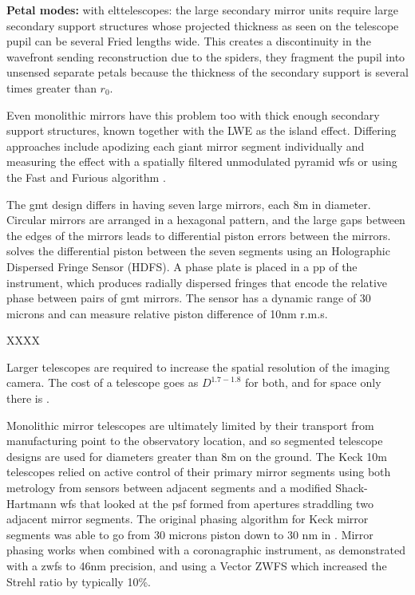 \documentclass[letterpaper]{ar-1col}
\begin{document}
{\bf Petal modes: } with \ac{elt}telescopes: the large secondary mirror units require large secondary support structures whose projected thickness as seen on the telescope pupil can be several Fried lengths wide.
%
This creates a discontinuity in the wavefront sending reconstruction due to the spiders, they fragment the pupil into unsensed separate petals because the thickness of the secondary support is several times greater than $r_0$.

Even monolithic mirrors have this problem too with thick enough secondary support structures, known together with the LWE as the island effect.
%
Differing approaches include apodizing each giant mirror segment individually \citep[Redundant Apodized Pupils; RAP ][]{Leboulleux22,Leboulleux22a} and  measuring the effect with a spatially filtered unmodulated pyramid \ac{wfs} \citep{Levraud24} or using the Fast and Furious algorithm  \citep[ demonstrated on Subaru/SCExAO in][]{Bos20}.

The \ac{gmt} design differs in having seven large mirrors, each 8m in diameter.
%
Circular mirrors are arranged in a hexagonal pattern, and the large gaps between the edges of the mirrors leads to differential piston errors between the mirrors.
%
\citet{Haffert22,Quiros-Pacheco22} solves the differential piston between the seven segments using an Holographic Dispersed Fringe Sensor (HDFS).
%
A phase plate is placed in a \ac{pp} of the instrument, which produces radially dispersed fringes that encode the relative phase between pairs of \ac{gmt} mirrors.
%
The sensor has a dynamic range of 30 microns and can measure relative piston difference of 10nm r.m.s.


XXXX


Larger telescopes are required to increase the spatial resolution of the imaging camera. The cost of a telescope goes as $D^{1.7-1.8}$ \citep{Stahl20} for both, and for space only there is \citet{Stahl10}.
 
Monolithic mirror telescopes are ultimately limited by their transport from manufacturing point to the observatory location, and so segmented telescope designs are used for diameters greater than 8m on the ground.
The Keck 10m telescopes relied on active control of their primary mirror segments using both metrology from sensors between adjacent segments and a modified Shack-Hartmann \ac{wfs} that looked at the \ac{psf} formed from apertures straddling two adjacent mirror segments.
%
The original phasing algorithm for Keck mirror segments was able to go from 30 microns piston down to 30 nm in \citet{Chanan98,Chanan00}.
%
Mirror phasing works when combined with a coronagraphic instrument, as \citep{vanKooten22} demonstrated with a \ac{zwfs} to 46nm precision, and \citep{Salama24} using a Vector ZWFS which increased the Strehl ratio by typically 10\%.
\end{document}

